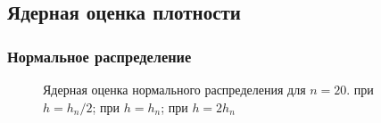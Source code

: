 \documentclass{article}
\begin{document}
\newpage
\subsection{Ядерная оценка плотности}

\subsubsection{Нормальное распределение}

\begin{figure}[ht!]  
\centering 
{}  
\caption{Ядерная оценка нормального распределения для $n=20$.  
при $h=h_n/2$; 
при $h=h_n$; 
при $h=2h_n$}
\end{figure}
\end{document}
